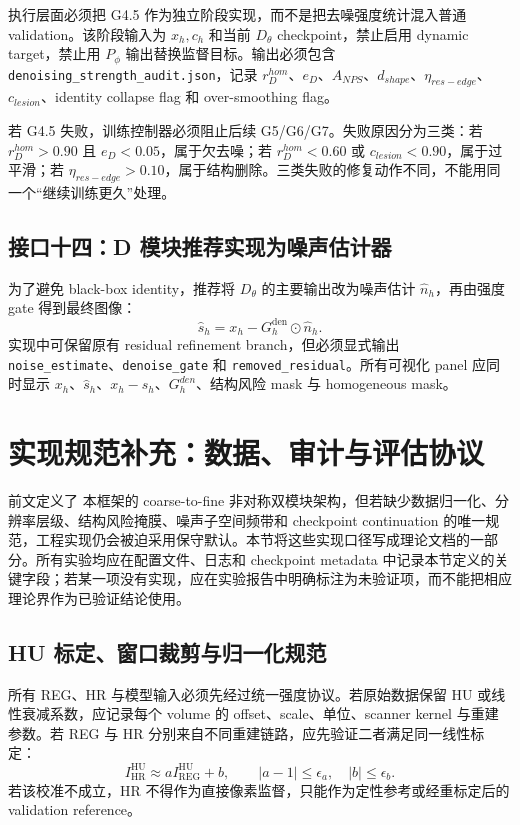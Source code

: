 \documentclass[11pt,a4paper,UTF8,fontset=fandol]{ctexart}
\theoremstyle{definition}
\begin{document}
执行层面必须把 G4.5 作为独立阶段实现，而不是把去噪强度统计混入普通 validation。该阶段输入为 $x_h,c_h$ 和当前 $D_\theta$ checkpoint，禁止启用 dynamic target，禁止用 $P_\phi$ 输出替换监督目标。输出必须包含 \texttt{denoising\_strength\_audit.json}，记录 $r_D^{hom}$、$e_D$、$A_{NPS}$、$d_{shape}$、$\eta_{res-edge}$、$c_{lesion}$、identity collapse flag 和 over-smoothing flag。

若 G4.5 失败，训练控制器必须阻止后续 G5/G6/G7。失败原因分为三类：若 $r_D^{hom}>0.90$ 且 $e_D<0.05$，属于欠去噪；若 $r_D^{hom}<0.60$ 或 $c_{lesion}<0.90$，属于过平滑；若 $\eta_{res-edge}>0.10$，属于结构删除。三类失败的修复动作不同，不能用同一个“继续训练更久”处理。

\subsection{接口十四：D 模块推荐实现为噪声估计器}

为了避免 black-box identity，推荐将 $D_\theta$ 的主要输出改为噪声估计 $\hat n_h$，再由强度 gate 得到最终图像：
\begin{equation}
    \hat s_h=x_h-G_h^{\mathrm{den}}\odot \hat n_h.
\end{equation}
实现中可保留原有 residual refinement branch，但必须显式输出 \texttt{noise\_estimate}、\texttt{denoise\_gate} 和 \texttt{removed\_residual}。所有可视化 panel 应同时显示 $x_h$、$\hat s_h$、$x_h-\hat s_h$、$G_h^{den}$、结构风险 mask 与 homogeneous mask。


\section{实现规范补充：数据、审计与评估协议}
\label{sec:implementation-protocol-full}

前文定义了 本框架的 coarse-to-fine 非对称双模块架构，但若缺少数据归一化、分辨率层级、结构风险掩膜、噪声子空间频带和 checkpoint continuation 的唯一规范，工程实现仍会被迫采用保守默认。本节将这些实现口径写成理论文档的一部分。所有实验均应在配置文件、日志和 checkpoint metadata 中记录本节定义的关键字段；若某一项没有实现，应在实验报告中明确标注为未验证项，而不能把相应理论界作为已验证结论使用。

\subsection{HU 标定、窗口裁剪与归一化规范}
\label{subsec:hu-normalization-protocol}

所有 REG、HR 与模型输入必须先经过统一强度协议。若原始数据保留 HU 或线性衰减系数，应记录每个 volume 的 offset、scale、单位、scanner kernel 与重建参数。若 REG 与 HR 分别来自不同重建链路，应先验证二者满足同一线性标定：
\begin{equation}
    I_{\mathrm{HR}}^{\mathrm{HU}}\approx a I_{\mathrm{REG}}^{\mathrm{HU}}+b,
    \qquad |a-1|\le \epsilon_a,
    \quad |b|\le \epsilon_b .
\end{equation}
若该校准不成立，HR 不得作为直接像素监督，只能作为定性参考或经重标定后的 validation reference。
\end{document}
